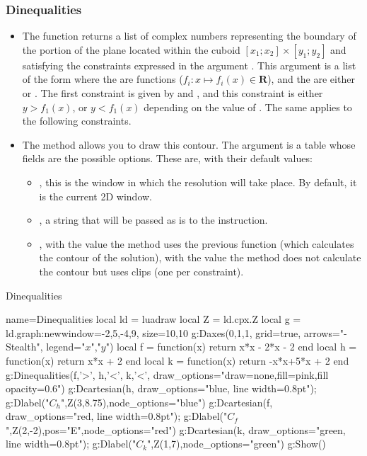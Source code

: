 \subsubsection{Dinequalities}

\begin{itemize}

\item The function  returns a list of complex numbers representing the boundary of the portion of the plane located within the cuboid $[x_1;x_2]\times[y_1;y_2]$ and satisfying the constraints expressed in the argument . This argument is a list of the form  where the  are functions ($f_i\colon x \mapsto f_i(x)\in \mathbf R$), and the  are either  or . The first constraint is given by  and , and this constraint is either $y > f_1(x)$, or $y < f_1(x)$ depending on the value of . The same applies to the following constraints.

\item The  method allows you to draw this contour. The argument  is a table whose fields are the possible options. These are, with their default values:
    \begin{itemize}
        \item {}, this is the window in which the resolution will take place. By default, it is the current 2D window.
        \item {}, a string that will be passed as is to the \drawcmd instruction.
        \item {}, with the value \false the method uses the previous function (which calculates the contour of the solution), with the value \true the method does not calculate the contour but uses clips (one per constraint).
    \end{itemize}
\end{itemize}

\begin{demo}{Dinequalities}
\begin{luadraw}{name=Dinequalities}
local ld = luadraw
local Z = ld.cpx.Z
local g = ld.graph:new{window={-2,5,-4,9}, size={10,10}}
g:Daxes({0,1,1}, {grid=true, arrows="-Stealth", legend={"$x$","$y$"}})
local f = function(x) return x*x - 2*x - 2 end
local h = function(x) return x*x + 2 end
local k = function(x) return -x*x+5*x + 2 end
g:Dinequalities({f,'>', h,'<', k,'<'}, {draw_options="draw=none,fill=pink,fill opacity=0.6"})
g:Dcartesian(h, {draw_options="blue, line width=0.8pt"}); g:Dlabel("$C_h$",Z(3,8.75),{node_options="blue"})
g:Dcartesian(f, {draw_options="red, line width=0.8pt"}); g:Dlabel("$C_f$",Z(2,-2),{pos="E",node_options="red"})
g:Dcartesian(k, {draw_options="green, line width=0.8pt"}); g:Dlabel("$C_k$",Z(1,7),{node_options="green"})
g:Show()
\end{luadraw}
\end{demo}

